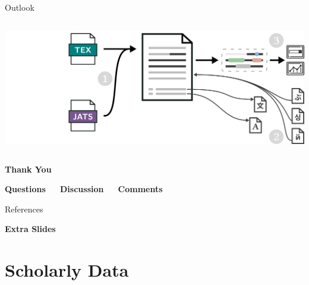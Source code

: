 \documentclass[en,16:9,smallfoot]{sdqbeamer}
\begin{document}
\begin{frame}[t]{Outlook}
\begin{columns}
\begin{overprint}
               \includegraphics[width=\textwidth]{imgs/outlook_5}
          \end{overprint}
   \end{columns}
   \end{frame}

   \begin{frame}[plain]
        \centering

        \vspace{0.7cm}
        \begin{Huge}
        \textbf{Thank You \faSmileO}\\
        \end{Huge}

        \vspace{0.7cm}
        \begin{Large}
        \textbf{Questions~~~Discussion~~~Comments}\\
        \end{Large}
   \end{frame}

   \begin{frame}[allowframebreaks]{References}
   \footnotesize
   \printbibliography
   \end{frame}

   \appendix

   \begin{frame}[plain]
        \vspace{0.7cm}
        \begin{infobox-map}
        \centering
        \begin{Huge}
        \textbf{Extra Slides}\\
        \end{Huge}
        \end{infobox-map}
   \end{frame}

\section{Scholarly Data}
\end{document}
